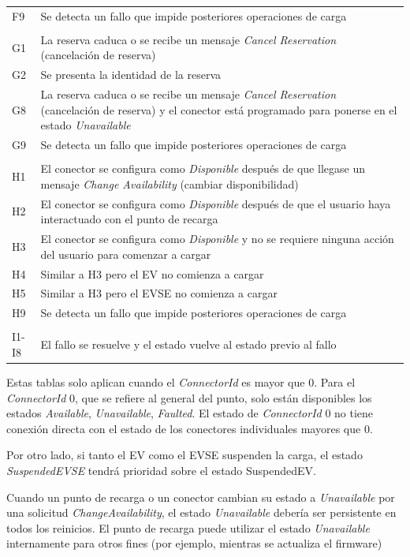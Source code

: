 \documentclass[12pt,a4paper,onecolumn,oneside]{report}
\begin{document}
\begin{longtable}{|p{1cm}|p{14cm}|}
F9 & Se detecta un fallo que impide posteriores operaciones de carga \\
 & \\
G1 & La reserva caduca o se recibe un mensaje \textit{Cancel Reservation} (cancelación de reserva)\\
G2 & Se presenta la identidad de la reserva\\
G8 &  La reserva caduca o se recibe un mensaje \textit{Cancel Reservation} (cancelación de reserva) y el conector está programado para ponerse en el estado \textit{Unavailable}\\
G9 & Se detecta un fallo que impide posteriores operaciones de carga \\
 & \\
H1 & El conector se configura como \textit{Disponible} después de que llegase un mensaje \textit{Change Availability} (cambiar disponibilidad)\\
H2 & El conector se configura como \textit{Disponible} después de que el usuario haya interactuado con el punto de recarga\\
H3 & El conector se configura como \textit{Disponible} y no se requiere ninguna acción del usuario para comenzar a cargar\\
H4 & Similar a H3 pero el EV no comienza a cargar\\
H5 & Similar a H3 pero el EVSE no comienza a cargar\\
H9 & Se detecta un fallo que impide posteriores operaciones de carga \\
 & \\
I1-I8 & El fallo se resuelve y el estado vuelve al estado previo al fallo \\
\hline
\end{longtable}


Estas tablas solo aplican cuando el \textit{ConnectorId} es mayor que 0. Para el \textit{ConnectorId} 0, que se refiere al general del punto, solo están disponibles los estados \textit{Available}, \textit{Unavailable}, \textit{Faulted}. El estado de \textit{ConnectorId} 0 no tiene conexión directa con el estado de los conectores individuales mayores que 0.

Por otro lado, si tanto el EV como el EVSE suspenden la carga, el estado \textit{SuspendedEVSE} tendrá prioridad sobre el estado SuspendedEV.

Cuando un punto de recarga o un conector cambian su estado a \textit{Unavailable} por una solicitud \textit{ChangeAvailability}, el estado \textit{Unavailable} debería ser persistente en todos los reinicios. El punto de recarga puede utilizar el estado \textit{Unavailable} internamente para otros fines (por ejemplo, mientras se actualiza el firmware)
\end{document}
